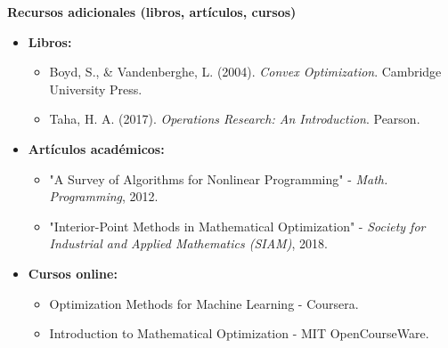\begin{flushleft}
	\textbf{Recursos adicionales (libros, artículos, cursos)}
\end{flushleft}

\begin{itemize}
	\item \textbf{Libros:}
	\begin{itemize}
		\item Boyd, S., \& Vandenberghe, L. (2004). \textit{Convex Optimization}. Cambridge University Press.
		\item Taha, H. A. (2017). \textit{Operations Research: An Introduction}. Pearson.
	\end{itemize}
	\item \textbf{Artículos académicos:}
	\begin{itemize}
		\item "A Survey of Algorithms for Nonlinear Programming" - \textit{Math. Programming}, 2012.
		\item "Interior-Point Methods in Mathematical Optimization" - \textit{Society for Industrial and Applied Mathematics (SIAM)}, 2018.
	\end{itemize}
	\item \textbf{Cursos online:}
	\begin{itemize}
		\item Optimization Methods for Machine Learning - Coursera.
		\item Introduction to Mathematical Optimization - MIT OpenCourseWare.
	\end{itemize}
\end{itemize}
